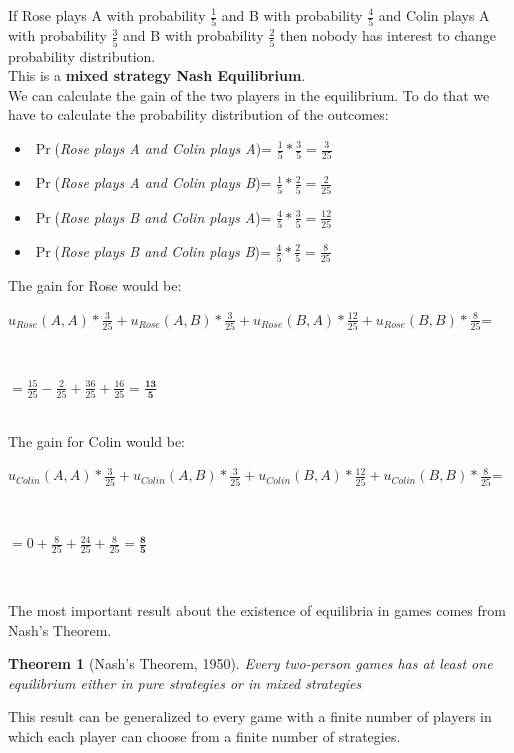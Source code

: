 \documentclass{article}
\newtheorem{theorem}{Theorem}
\begin{document}
If Rose plays A with probability $\frac{1}{5}$ and B with probability $\frac{4}{5}$ and Colin plays A with probability $\frac{3}{5}$ and B with probability $\frac{2}{5}$ then nobody has interest to change probability distribution.\\
This is a \textbf{mixed strategy Nash Equilibrium}.\\
We can calculate the gain of the two players in the equilibrium. To do that we have to calculate the probability distribution of the outcomes: 
\begin{itemize}
	\item $\Pr$(\textit{Rose plays A and Colin plays A})= $\frac{1}{5}*\frac{3}{5}=\frac{3}{25}$ 
	\item $\Pr$(\textit{Rose plays A and Colin plays B})= $\frac{1}{5}*\frac{2}{5}=\frac{2}{25}$ 
	\item $\Pr$(\textit{Rose plays B and Colin plays A})= $\frac{4}{5}*\frac{3}{5}=\frac{12}{25}$ 
	\item $\Pr$(\textit{Rose plays B and Colin plays B})= $\frac{4}{5}*\frac{2}{5}=\frac{8}{25}$ 
\end{itemize}
The gain for Rose would be:\\

\centerline{$u_{Rose}(A,A)*\frac{3}{25} +u_{Rose}(A,B)*\frac{3}{25}+ u_{Rose}(B,A)*\frac{12}{25}+ u_{Rose}(B,B)*\frac{8}{25}$=} \mbox{}\\
\centerline{$=\frac{15}{25}-\frac{2}{25}+\frac{36}{25}+\frac{16}{25}=\mathbf{\frac{13}{5}}$} \mbox{}\\
The gain for Colin would be:\\

\centerline{$u_{Colin}(A,A)*\frac{3}{25} +u_{Colin}(A,B)*\frac{3}{25}+ u_{Colin}(B,A)*\frac{12}{25}+ u_{Colin}(B,B)*\frac{8}{25}$=} \mbox{}\\
\centerline{$=0+\frac{8}{25}+\frac{24}{25}+\frac{8}{25}=\mathbf{\frac{8}{5}}$} \mbox{}\\
\pagebreak

The most important result about the existence of equilibria in games comes from Nash's Theorem.
\begin{theorem}
	[Nash's Theorem, 1950] Every two-person games has at least one equilibrium either in pure strategies or in mixed strategies 
\end{theorem}
This result can be generalized to every game with a finite number of players in which each player can choose from a finite number of strategies.
\end{document}
